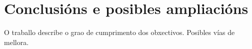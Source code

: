 \chapter{Conclusións e posibles ampliacións}

O traballo describe o grao de cumprimento dos obxectivos. Posibles vías de mellora.
